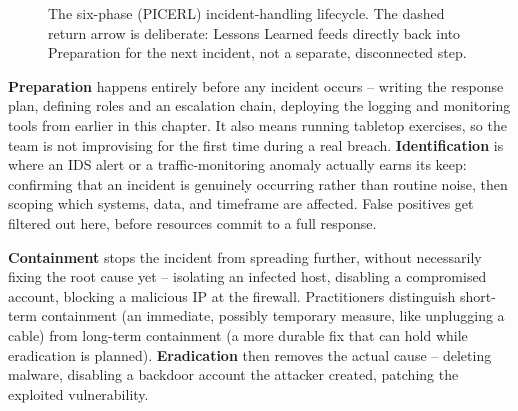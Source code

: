 \begin{figure}[h]
\centering
{}
\caption{The six-phase (PICERL) incident-handling lifecycle. The dashed return arrow is deliberate:
Lessons Learned feeds directly back into Preparation for the next incident, not a separate,
disconnected step.}
\label{fig:3.5-ir-lifecycle}
\end{figure}

\textbf{Preparation} happens entirely before any incident occurs -- writing the response plan,
defining roles and an escalation chain, deploying the logging and monitoring tools from earlier in
this chapter. It also means running tabletop exercises, so the team is not improvising for the
first time during a real breach. \textbf{Identification} is where an IDS alert or a
traffic-monitoring anomaly actually earns its keep: confirming that an incident is genuinely
occurring rather than routine noise, then scoping which systems, data, and timeframe are affected.
False positives get filtered out here, before resources commit to a full response.

\textbf{Containment} stops the incident from spreading further, without necessarily fixing the root
cause yet -- isolating an infected host, disabling a compromised account, blocking a malicious IP
at the firewall. Practitioners distinguish short-term containment (an immediate, possibly
temporary measure, like unplugging a cable) from long-term containment (a more durable fix that
can hold while eradication is planned). \textbf{Eradication} then removes the actual cause -- deleting
malware, disabling a backdoor account the attacker created, patching the exploited vulnerability.


